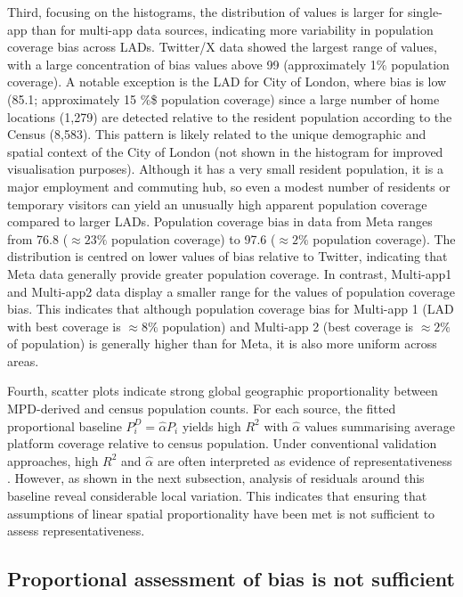 \documentclass[]{rsos}%
\begin{document}
Third, focusing on the histograms, the distribution of values is larger
for single-app than for multi-app data sources, indicating more
variability in population coverage bias across LADs. Twitter/X data
showed the largest range of values, with a large concentration of bias
values above 99 (approximately 1\% population coverage). A notable
exception is the LAD for City of London, where bias is low (85.1;
approximately 15 \%\$ population coverage) since a large number of home
locations (1,279) are detected relative to the resident population
according to the Census (8,583). This pattern is likely related to the
unique demographic and spatial context of the City of London (not shown
in the histogram for improved visualisation purposes). Although it has a
very small resident population, it is a major employment and commuting
hub, so even a modest number of residents or temporary visitors can
yield an unusually high apparent population coverage compared to larger
LADs. Population coverage bias in data from Meta ranges from 76.8
(\(\approx 23 \%\) population coverage) to 97.6 (\(\approx 2 \%\) population
coverage). The distribution is centred on lower values of bias relative
to Twitter, indicating that Meta data generally provide greater
population coverage. In contrast, Multi-app1 and Multi-app2 data display
a smaller range for the values of population coverage bias. This
indicates that although population coverage bias for Multi-app 1 (LAD
with best coverage is \(\approx 8 \%\) population) and Multi-app 2 (best
coverage is \(\approx 2\%\) of population) is generally higher than for
Meta, it is also more uniform across areas.

Fourth, scatter plots indicate strong global geographic proportionality
between MPD-derived and census population counts. For each source, the
fitted proportional baseline \(P_i^D = \hat{\alpha}P_i\) yields high \(R^2\)
with \(\hat{\alpha}\) values summarising average platform coverage
relative to census population. Under conventional validation approaches,
high \(R^2\) and \(\hat{\alpha}\) are often interpreted as evidence of
representativeness \citep{iradukunda2025estimating, renninger2026}. However,
as shown in the next subsection, analysis of residuals around this
baseline reveal considerable local variation. This indicates that
ensuring that assumptions of linear spatial proportionality have been
met is not sufficient to assess representativeness.

\subsection{Proportional assessment of bias is not sufficient}\label{proportional-assessment-of-bias-is-not-sufficient}
\end{document}
